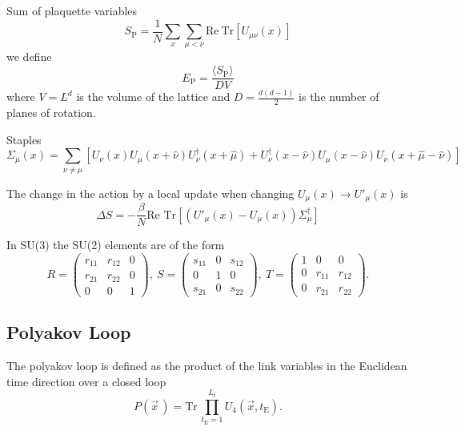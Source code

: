 \documentclass[12pt,a4paper]{article}
\begin{document}
Sum of plaquette variables
\begin{equation}
	\label{eq:Sp}
	S_{\text{P}} = \frac{1}{N} \sum_x\sum_{\mu < \nu} \text{Re}\ \text{Tr} [U_{\mu\nu}(x)]
\end{equation}
we define
\begin{equation}
	\label{eq:Ep}
	E_{\text{P}} =\frac{ \langle S_{\text{P}} \rangle}{D V}
\end{equation}
where $V=L^d$ is the volume of the lattice and $D = \frac{d(d-1)}{2}$ is the number of planes of rotation.

Staples
\begin{equation}
	\label{eq:staples}
	\Sigma_{\mu}(x) = \sum_{\nu \neq \mu} \left[ U_{\nu}(x)U_{\mu}(x+\hat{\nu})U_{\nu}^{\dagger}(x+\hat{\mu}) + U_{\nu}^{\dagger}(x-\hat{\nu})U_{\mu}(x-\hat{\nu})U_{\nu}(x+\hat{\mu}-\hat{\nu})\right]
\end{equation}


The change in the action  by a local update when changing $U_{\mu}(x) \to U'_{\mu}(x)$ is
\begin{equation}
	\label{eq:DS}
	\Delta S = -\frac{\beta}{N} \text{Re } \text{Tr} \left[ \left( U'_{\mu}(x) - U_{\mu}(x) \right)\Sigma_{\mu}^{\dagger}\right]
\end{equation}

In SU(3) the SU(2) elements are of the form
\begin{equation}
\label{eq:SU2_subgroups}
	R = \begin{pmatrix}
		r_{11} & r_{12} & 0 \\
		r_{21} & r_{22} & 0 \\
		0      & 0      & 1 
	\end{pmatrix},\ S = \begin{pmatrix}
		s_{11} & 0 & s_{12} \\
		0      & 1 & 0 \\
		s_{21} & 0 & s_{22} 
	\end{pmatrix},\ T = \begin{pmatrix}
		1 & 0 & 0 \\
		0 & r_{11} & r_{12} \\
		0 & r_{21} & r_{22}
	\end{pmatrix}.
\end{equation}


	\subsection{Polyakov Loop}
	The polyakov loop is defined as the product of the link variables in the Euclidean time direction over a closed loop
	\begin{equation}
		P(\vec{x}\,) = \text{Tr}\,\prod_{t_\text{E}=1}^{L_t}U_4(\vec{x},t_\text{E}).
	\end{equation}
\end{document}

